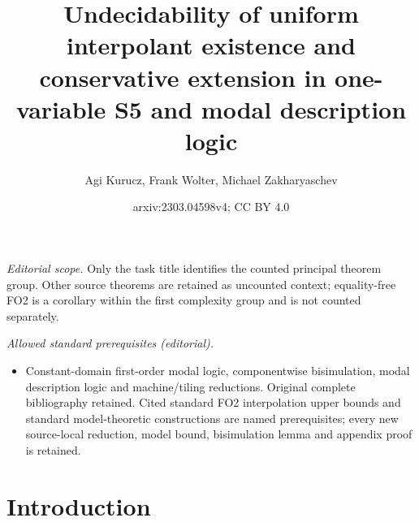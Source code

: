 \documentclass[10pt,a4paper]{amsart}
\title{Undecidability of uniform interpolant existence and conservative extension in one-variable S5 and modal description logic}
\author{Agi Kurucz, Frank Wolter, Michael Zakharyaschev}
\date{arxiv:2303.04598v4; CC BY 4.0}
\theoremstyle{plain}
\theoremstyle{definition}
\begin{document}
\maketitle
\noindent\textit{Editorial scope.} Only the task title identifies the counted principal theorem group. Other source theorems are retained as uncounted context; equality-free FO2 is a corollary within the first complexity group and is not counted separately.\par\medskip
\noindent\textit{Allowed standard prerequisites (editorial).}\begin{itemize}
\item Constant-domain first-order modal logic, componentwise bisimulation, modal description logic and machine/tiling reductions. Original complete bibliography retained. Cited standard FO2 interpolation upper bounds and standard model-theoretic constructions are named prerequisites; every new source-local reduction, model bound, bisimulation lemma and appendix proof is retained.
\end{itemize}\medskip
\section{Introduction}\label{intro}
\end{document}
